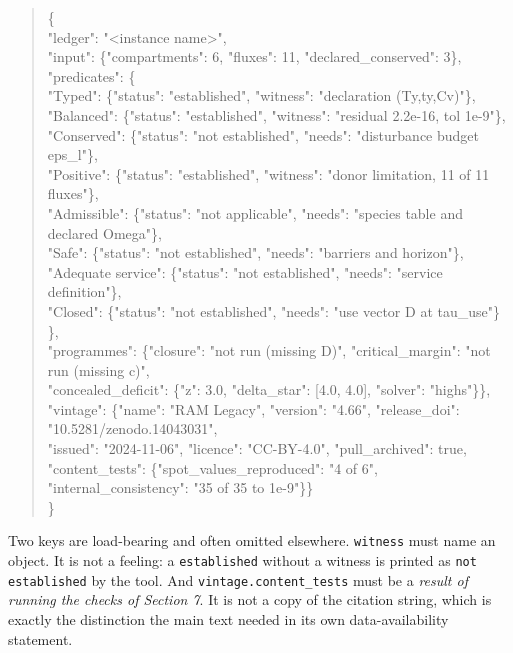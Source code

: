 \documentclass[11pt]{article}
\begin{document}
\begin{quote}\ttfamily\footnotesize\raggedright\setlength{\parskip}{0pt}
\{\\
  "ledger": "<instance name>",\\
  "input": \{"compartments": 6, "fluxes": 11, "declared\_conserved": 3\},\\
  "predicates": \{\\
     "Typed":            \{"status": "established", "witness": "declaration (Ty,ty,Cv)"\},\\
     "Balanced":         \{"status": "established", "witness": "residual 2.2e-16, tol 1e-9"\},\\
     "Conserved":        \{"status": "not established", "needs": "disturbance budget eps\_l"\},\\
     "Positive":         \{"status": "established", "witness": "donor limitation, 11 of 11 fluxes"\},\\
     "Admissible":       \{"status": "not applicable", "needs": "species table and declared Omega"\},\\
     "Safe":             \{"status": "not established", "needs": "barriers and horizon"\},\\
     "Adequate service": \{"status": "not established", "needs": "service definition"\},\\
     "Closed":           \{"status": "not established", "needs": "use vector D at tau\_use"\}\\
  \},\\
  "programmes": \{"closure": "not run (missing D)", "critical\_margin": "not run (missing c)",\\
                 "concealed\_deficit": \{"z": 3.0, "delta\_star": [4.0, 4.0], "solver": "highs"\}\},\\
  "vintage": \{"name": "RAM Legacy", "version": "4.66", "release\_doi": "10.5281/\allowbreak{}zenodo.14043031",\\
              "issued": "2024-11-06", "licence": "CC-BY-4.0", "pull\_archived": true,\\
              "content\_tests": \{"spot\_values\_reproduced": "4 of 6", "internal\_consistency": "35 of 35 to 1e-9"\}\}\\
\}
\end{quote}

Two keys are load-bearing and often omitted elsewhere. \texttt{witness} must name an object. It is not a feeling: a \texttt{established} without a witness is printed as \texttt{not establis\allowbreak{}hed} by the tool. And \texttt{vintage.\allowbreak{}content\_test\allowbreak{}s} must be a \emph{result of running the checks of Section 7}. It is not a copy of the citation string, which is exactly the distinction the main text needed in its own data-availability statement.
\end{document}
